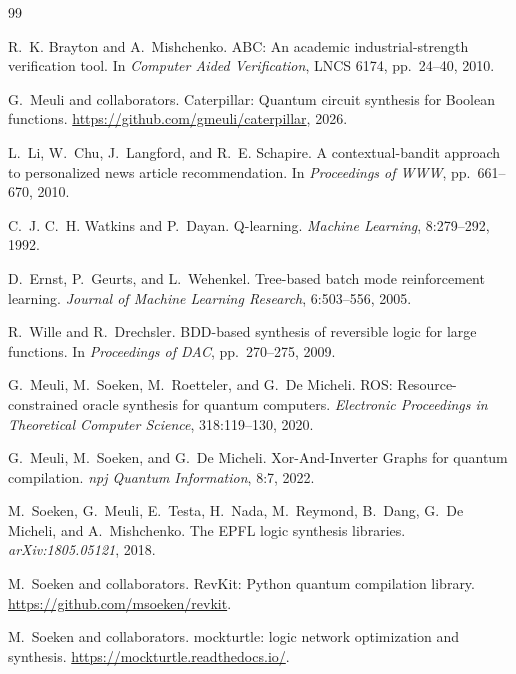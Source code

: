 \documentclass[UTF8,fontset=macnew,11pt]{ctexart}
\begin{document}
\begin{thebibliography}{99}

R.~K. Brayton and A.~Mishchenko.
\newblock ABC: An academic industrial-strength verification tool.
\newblock In \emph{Computer Aided Verification}, LNCS 6174, pp.~24--40, 2010.

G.~Meuli and collaborators.
\newblock Caterpillar: Quantum circuit synthesis for Boolean functions.
\newblock \url{https://github.com/gmeuli/caterpillar}, 2026.

L.~Li, W.~Chu, J.~Langford, and R.~E. Schapire.
\newblock A contextual-bandit approach to personalized news article recommendation.
\newblock In \emph{Proceedings of WWW}, pp.~661--670, 2010.

C.~J. C.~H. Watkins and P.~Dayan.
\newblock Q-learning.
\newblock \emph{Machine Learning}, 8:279--292, 1992.

D.~Ernst, P.~Geurts, and L.~Wehenkel.
\newblock Tree-based batch mode reinforcement learning.
\newblock \emph{Journal of Machine Learning Research}, 6:503--556, 2005.

R.~Wille and R.~Drechsler.
\newblock BDD-based synthesis of reversible logic for large functions.
\newblock In \emph{Proceedings of DAC}, pp.~270--275, 2009.

G.~Meuli, M.~Soeken, M.~Roetteler, and G.~De Micheli.
\newblock ROS: Resource-constrained oracle synthesis for quantum computers.
\newblock \emph{Electronic Proceedings in Theoretical Computer Science}, 318:119--130, 2020.

G.~Meuli, M.~Soeken, and G.~De Micheli.
\newblock Xor-And-Inverter Graphs for quantum compilation.
\newblock \emph{npj Quantum Information}, 8:7, 2022.

M.~Soeken, G.~Meuli, E.~Testa, H.~Nada, M.~Reymond, B.~Dang, G.~De Micheli, and A.~Mishchenko.
\newblock The EPFL logic synthesis libraries.
\newblock \emph{arXiv:1805.05121}, 2018.

M.~Soeken and collaborators.
\newblock RevKit: Python quantum compilation library.
\newblock \url{https://github.com/msoeken/revkit}.

M.~Soeken and collaborators.
\newblock mockturtle: logic network optimization and synthesis.
\newblock \url{https://mockturtle.readthedocs.io/}.


\end{thebibliography}
\end{document}
